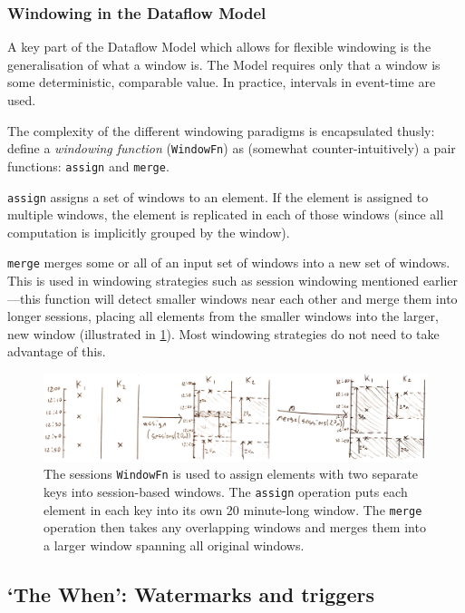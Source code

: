 \subsubsection{Windowing in the Dataflow Model}
A key part of the Dataflow Model which allows for flexible windowing is the generalisation of what a window is.
The Model requires only that a window is some deterministic, comparable value.
In practice, intervals in event-time are used.

The complexity of the different windowing paradigms is encapsulated thusly:
define a \emph{windowing function} (\verb|WindowFn|) as (somewhat counter-intuitively) a pair functions: \texttt{assign} and \texttt{merge}.

\texttt{assign} assigns a set of windows to an element.
If the element is assigned to multiple windows, the element is replicated in each of those windows (since all computation is implicitly grouped by the window).

\texttt{merge} merges some or all of an input set of windows into a new set of windows.
This is used in windowing strategies such as session windowing mentioned earlier---this function will detect smaller windows near each other and merge them into longer sessions, placing all elements from the smaller windows into the larger, new window (illustrated in \cref{fig:prep:sessions-merge}).
Most windowing strategies do not need to take advantage of this.

\begin{figure}[h]
	\includegraphics[width=\textwidth]{images/temp/sessions-assign-merge}
	\caption[An illustration of a \texttt{WindowFn} being used to place elements into session-based, unaligned windows.]
	{The sessions \texttt{WindowFn} is used to assign elements with two separate keys into session-based windows. The \texttt{assign} operation puts each element in each key into its own 20 minute-long window. The \texttt{merge} operation then takes any overlapping windows and merges them into a larger window spanning all original windows.}
	\label{fig:prep:sessions-merge}
\end{figure}


\subsection{`The When': Watermarks and triggers}\label{sec:prep:dataflow:when}

